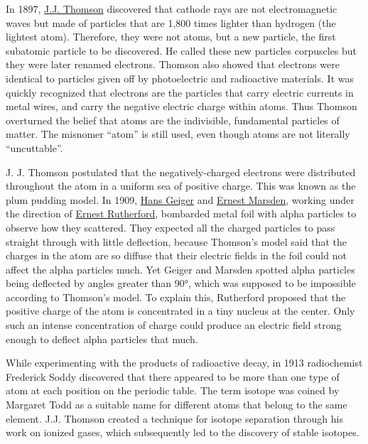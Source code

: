 In 1897, \href{https://en.wikipedia.org/wiki/J._J._Thomson}{J.J. Thomson} discovered that cathode rays are not electromagnetic waves but made of particles that are 1,800 times lighter than hydrogen (the lightest atom). Therefore, they were not atoms, but a new particle, the first subatomic particle to be discovered. He called these new particles corpuscles but they were later renamed electrons. Thomson also showed that electrons were identical to particles given off by photoelectric and radioactive materials. It was quickly recognized that electrons are the particles that carry electric currents in metal wires, and carry the negative electric charge within atoms. Thus Thomson overturned the belief that atoms are the indivisible, fundamental particles of matter. The misnomer ``atom'' is still used, even though atoms are not literally ``uncuttable''.

J. J. Thomson postulated that the negatively-charged electrons were distributed throughout the atom in a uniform sea of positive charge. This was known as the plum pudding model. In 1909, \href{https://en.wikipedia.org/wiki/Hans_Geiger}{Hans Geiger} and \href{https://en.wikipedia.org/wiki/Ernest_Marsden}{Ernest Marsden}, working under the direction of \href{https://en.wikipedia.org/wiki/Ernest_Rutherford}{Ernest Rutherford}, bombarded metal foil with alpha particles to observe how they scattered. They expected all the charged particles to pass straight through with little deflection, because Thomson's model said that the charges in the atom are so diffuse that their electric fields in the foil could not affect the alpha particles much. Yet Geiger and Marsden spotted alpha particles being deflected by angles greater than 90°, which was supposed to be impossible according to Thomson's model. To explain this, Rutherford proposed that the positive charge of the atom is concentrated in a tiny nucleus at the center. Only such an intense concentration of charge could produce an electric field strong enough to deflect alpha particles that much.

While experimenting with the products of radioactive decay, in 1913 radiochemist Frederick Soddy discovered that there appeared to be more than one type of atom at each position on the periodic table. The term isotope was coined by Margaret Todd as a suitable name for different atoms that belong to the same element. J.J. Thomson created a technique for isotope separation through his work on ionized gases, which subsequently led to the discovery of stable isotopes.

